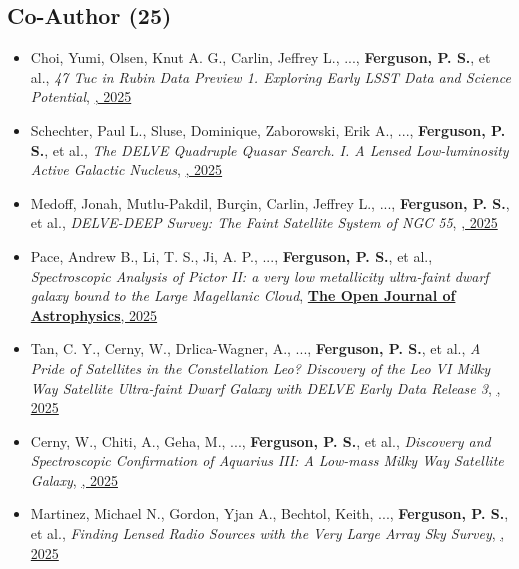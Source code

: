 \subsection{Co-Author  (25)}
\begin{itemize}[itemsep=1pt]
    \item {Choi}, Yumi, {Olsen}, Knut A. G., {Carlin}, Jeffrey L., ..., \textbf{Ferguson, P. S.}, et al., \textit{{47 Tuc in Rubin Data Preview 1. Exploring Early LSST Data and Science Potential}}, \href{https://ui.adsabs.harvard.edu/abs/2025ApJ...992...47C}{\textbf{\apj}, 2025}
    \item {Schechter}, Paul L., {Sluse}, Dominique, {Zaborowski}, Erik A., ..., \textbf{Ferguson, P. S.}, et al., \textit{{The DELVE Quadruple Quasar Search. I. A Lensed Low-luminosity Active Galactic Nucleus}}, \href{https://ui.adsabs.harvard.edu/abs/2025AJ....170..241S}{\textbf{\aj}, 2025}
    \item {Medoff}, Jonah, {Mutlu-Pakdil}, Bur{\c{c}}in, {Carlin}, Jeffrey L., ..., \textbf{Ferguson, P. S.}, et al., \textit{{DELVE-DEEP Survey: The Faint Satellite System of NGC 55}}, \href{https://ui.adsabs.harvard.edu/abs/2025ApJ...990..108M}{\textbf{\apj}, 2025}
    \item {Pace}, Andrew B., {Li}, T. S., {Ji}, A. P., ..., \textbf{Ferguson, P. S.}, et al., \textit{{Spectroscopic Analysis of Pictor II: a very low metallicity ultra-faint dwarf galaxy bound to the Large Magellanic Cloud}}, \href{https://ui.adsabs.harvard.edu/abs/2025OJAp....8E.112P}{\textbf{The Open Journal of Astrophysics}, 2025}
    \item {Tan}, C. Y., {Cerny}, W., {Drlica-Wagner}, A., ..., \textbf{Ferguson, P. S.}, et al., \textit{{A Pride of Satellites in the Constellation Leo? Discovery of the Leo VI Milky Way Satellite Ultra-faint Dwarf Galaxy with DELVE Early Data Release 3}}, \href{https://ui.adsabs.harvard.edu/abs/2025ApJ...979..176T}{\textbf{\apj}, 2025}
    \item {Cerny}, W., {Chiti}, A., {Geha}, M., ..., \textbf{Ferguson, P. S.}, et al., \textit{{Discovery and Spectroscopic Confirmation of Aquarius III: A Low-mass Milky Way Satellite Galaxy}}, \href{https://ui.adsabs.harvard.edu/abs/2025ApJ...979..164C}{\textbf{\apj}, 2025}
    \item {Martinez}, Michael N., {Gordon}, Yjan A., {Bechtol}, Keith, ..., \textbf{Ferguson, P. S.}, et al., \textit{{Finding Lensed Radio Sources with the Very Large Array Sky Survey}}, \href{https://ui.adsabs.harvard.edu/abs/2025ApJ...979..132M}{\textbf{\apj}, 2025}

\end{itemize}
